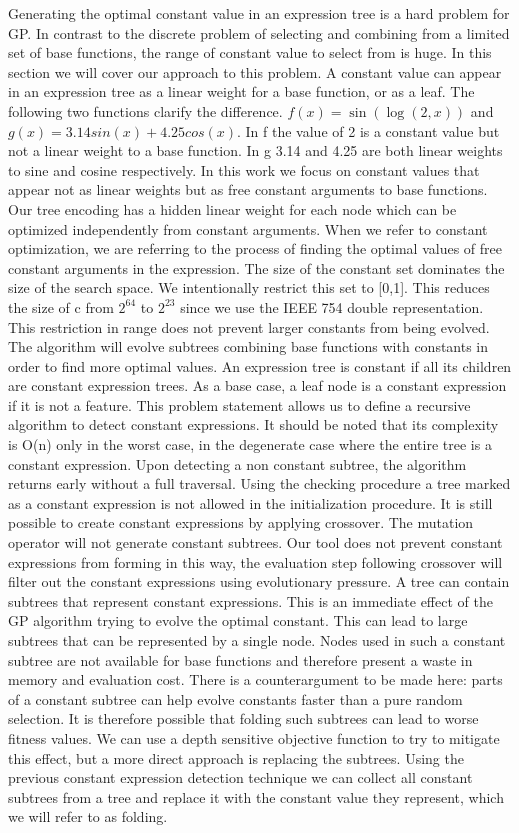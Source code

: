 Generating the optimal constant value in an expression tree is a hard problem for GP. In contrast to the discrete problem of selecting and combining from a limited set of base functions, the range of constant value to select from is huge. In this section we will cover our approach to this problem.
A constant value can appear in an expression tree as a linear weight for a base function, or as a leaf. The following two functions clarify the difference. $ f(x) = \sin(\log(2, x))$ and $ g(x) = 3.14 sin(x) + 4.25 cos(x)$. In f the value of 2 is a constant value but not a linear weight to a base function. In g 3.14 and 4.25 are both linear weights to sine and cosine respectively. In this work we focus on constant values that appear not as linear weights but as free constant arguments to base functions. Our tree encoding has a hidden linear weight for each node which can be optimized independently from constant arguments. When we refer to constant optimization, we are referring to the process of finding the optimal values of free constant arguments in the expression.
The size of the constant set dominates the size of the search space. We intentionally restrict this set to [0,1]. This reduces the size of c from $2^{64}$ to $2^{23}$ since we use the IEEE 754 double representation. This restriction in range does not prevent larger constants from being evolved. The algorithm will evolve subtrees combining base functions with constants in order to find more optimal values.
An expression tree is constant if all its children are constant expression trees. As a base case, a leaf node is a constant expression if it is not a feature. This problem statement allows us to define a recursive algorithm to detect constant expressions. It should be noted that its complexity is O(n) only in the worst case, in the degenerate case where the entire tree is a constant expression. Upon detecting a non constant subtree, the algorithm returns early without a full traversal. 
Using the checking procedure a tree marked as a constant expression is not allowed in the initialization procedure. It is still possible to create constant expressions by applying crossover. The mutation operator will not generate constant subtrees. Our tool does not prevent constant expressions from forming in this way, the evaluation step following crossover will filter out the constant expressions using evolutionary pressure. A tree can contain subtrees that represent constant expressions. This is an immediate effect of the GP algorithm trying to evolve the optimal constant. This can lead to large subtrees that can be represented by a single node. Nodes used in such a constant subtree are not available for base functions and therefore present a waste in memory and evaluation cost. There is a counterargument to be made here: parts of a constant subtree can help evolve constants faster than a pure random selection. It is therefore possible that folding such subtrees can lead to worse fitness values. We can use a depth sensitive objective function to try to mitigate this effect, but a more direct approach is replacing the subtrees. Using the previous constant expression detection technique we can collect all constant subtrees from a tree and replace it with the constant value they represent, which we will refer to as folding.
